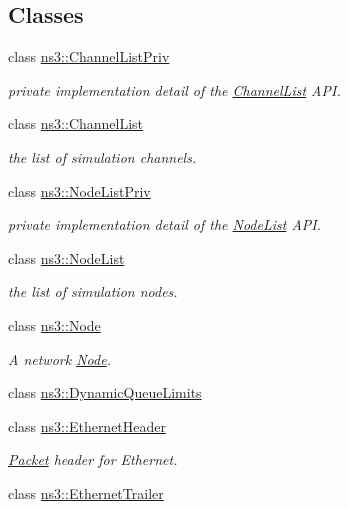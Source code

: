 \subsection*{Classes}
\begin{DoxyCompactItemize}
\item 
class \hyperlink{classns3_1_1ChannelListPriv}{ns3\+::\+Channel\+List\+Priv}
\begin{DoxyCompactList}\small\item\em private implementation detail of the \hyperlink{classns3_1_1ChannelList}{Channel\+List} A\+PI. \end{DoxyCompactList}\item 
class \hyperlink{classns3_1_1ChannelList}{ns3\+::\+Channel\+List}
\begin{DoxyCompactList}\small\item\em the list of simulation channels. \end{DoxyCompactList}\item 
class \hyperlink{classns3_1_1NodeListPriv}{ns3\+::\+Node\+List\+Priv}
\begin{DoxyCompactList}\small\item\em private implementation detail of the \hyperlink{classns3_1_1NodeList}{Node\+List} A\+PI. \end{DoxyCompactList}\item 
class \hyperlink{classns3_1_1NodeList}{ns3\+::\+Node\+List}
\begin{DoxyCompactList}\small\item\em the list of simulation nodes. \end{DoxyCompactList}\item 
class \hyperlink{classns3_1_1Node}{ns3\+::\+Node}
\begin{DoxyCompactList}\small\item\em A network \hyperlink{classns3_1_1Node}{Node}. \end{DoxyCompactList}\item 
class \hyperlink{classns3_1_1DynamicQueueLimits}{ns3\+::\+Dynamic\+Queue\+Limits}
\item 
class \hyperlink{classns3_1_1EthernetHeader}{ns3\+::\+Ethernet\+Header}
\begin{DoxyCompactList}\small\item\em \hyperlink{classns3_1_1Packet}{Packet} header for Ethernet. \end{DoxyCompactList}\item 
class \hyperlink{classns3_1_1EthernetTrailer}{ns3\+::\+Ethernet\+Trailer}

\end{DoxyCompactItemize}
